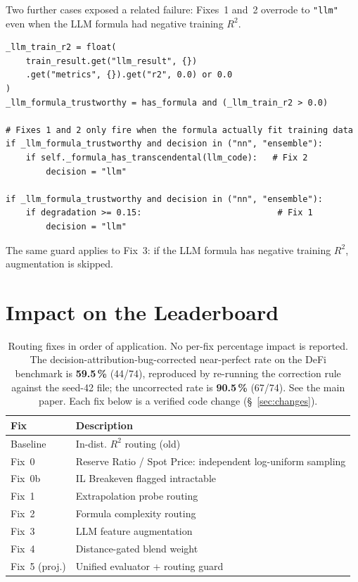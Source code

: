 \documentclass[twoside,11pt]{article}
\begin{document}
Two further cases exposed a related failure: Fixes~1 and~2 overrode to
\texttt{"llm"} even when the LLM formula had negative training $R^2$.

\begin{lstlisting}[caption={LLM-formula trustworthiness guard.}]
_llm_train_r2 = float(
    train_result.get("llm_result", {})
    .get("metrics", {}).get("r2", 0.0) or 0.0
)
_llm_formula_trustworthy = has_formula and (_llm_train_r2 > 0.0)

# Fixes 1 and 2 only fire when the formula actually fit training data
if _llm_formula_trustworthy and decision in ("nn", "ensemble"):
    if self._formula_has_transcendental(llm_code):   # Fix 2
        decision = "llm"

if _llm_formula_trustworthy and decision in ("nn", "ensemble"):
    if degradation >= 0.15:                           # Fix 1
        decision = "llm"
\end{lstlisting}

The same guard applies to Fix~3: if the LLM formula has negative training
$R^2$, augmentation is skipped.


\section{Impact on the Leaderboard}
\label{sec:leaderboard}

\begin{table}[h]
\centering
\caption{Routing fixes in order of application. No per-fix percentage impact is reported.
         The
         decision-attribution-bug-corrected near-perfect rate on the DeFi benchmark is
         \textbf{59.5\,\%} (44/74), reproduced by re-running the correction rule against the seed-42 file;
         the uncorrected rate is \textbf{90.5\,\%} (67/74). See the main paper.
         Each fix below is a verified code change (\S~\ref{sec:changes}).}
\label{tab:projected}
\begin{tabular}{ll}
\toprule
\textbf{Fix} & \textbf{Description} \\
\midrule
Baseline    & In-dist. $R^2$ routing (old) \\
Fix~0       & Reserve Ratio / Spot Price: independent log-uniform sampling \\
Fix~0b      & IL Breakeven flagged intractable \\
Fix~1       & Extrapolation probe routing \\
Fix~2       & Formula complexity routing \\
Fix~3       & LLM feature augmentation \\
Fix~4       & Distance-gated blend weight \\
Fix~5 (proj.) & Unified evaluator + routing guard \\
\bottomrule
\end{tabular}
\end{table}
\end{document}
